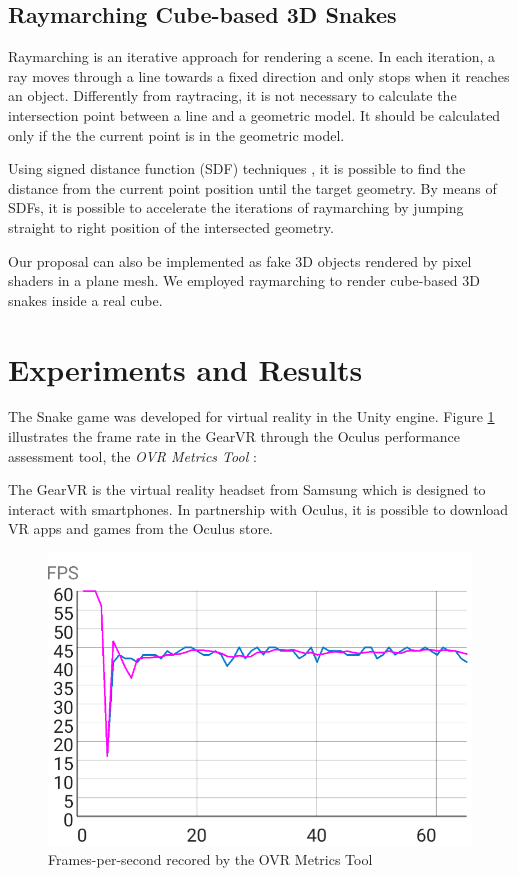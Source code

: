 \documentclass[runningheads]{llncs}
\begin{document}
\subsection{Raymarching Cube-based 3D Snakes}
\label{subsec:raymarching-snakes}
Raymarching is an iterative approach for rendering a scene. In each iteration, a ray moves through a line towards a fixed direction and only stops when it reaches an object. Differently from raytracing, it is not necessary to calculate the intersection point between a line and a geometric model. It should be calculated only if the the current point is in the geometric model.

Using signed distance function (SDF) techniques \cite{hart1996sphere}, it is possible to find the distance from the current point position until the target geometry. By means of SDFs, it is possible to accelerate the iterations of raymarching by jumping straight to right position of the intersected geometry.

Our proposal can also be implemented as fake 3D objects rendered by pixel shaders in a plane mesh. We employed raymarching to render cube-based 3D snakes inside a real cube.

\section{Experiments and Results} \label{sec:results}

The Snake game was developed for virtual reality in the Unity engine. Figure \ref{fig:VRPerformanceChart}  illustrates the frame rate in the GearVR through the Oculus performance assessment tool, the \textit{OVR Metrics Tool} \cite{ovrmetrictool}:

The GearVR is the virtual reality headset from Samsung which is designed to interact with smartphones. In partnership with Oculus, it is possible to download VR apps and games from the Oculus store.

\begin{figure}[h]
\centering
\includegraphics[width=\textwidth]{src/hci2020-images/VRPerformance.png}
\caption{Frames-per-second recored by the OVR Metrics Tool}
\label{fig:VRPerformanceChart}
\end{figure}
\end{document}

